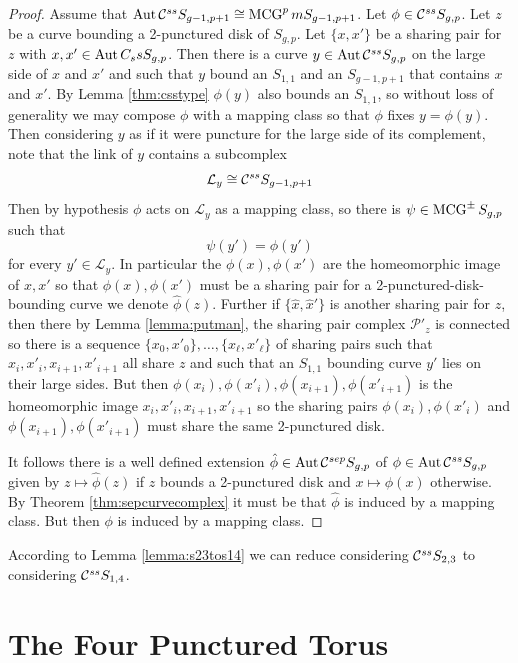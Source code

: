 \begin{proof}
  Assume that $\operatorname{Aut}  \mathcal C^{{ss}}  S_{g-1,p+1} \cong \operatorname{MCG}^pm S_{g-1,p+1}$.
  Let $\phi \in  \mathcal C^{{ss}}  S_{g,p}$.
  Let $z$ be a curve bounding a 2-punctured disk of $S_{g,p}$.
  Let $\{x,x'\}$ be a sharing pair for $z$ with $x,x' \in \operatorname{Aut} C_ss S_{g,p}$.
  Then there is a curve $y \in \operatorname{Aut}  \mathcal C^{{ss}}  S_{g,p}$ on the large side of $x$ and $x'$ and such that $y$ bound an $S_{1,1}$ and an $S_{g-1,p+1}$ that contains $x$ and $x'$.
  By Lemma \ref{thm:csstype} $\phi(y)$ also bounds an $S_{1,1}$,
  so without loss of generality we may compose $\phi$ with a mapping class so that $\phi$ fixes $y=\phi(y)$.
  Then considering $y$ as if it were puncture for the large side of its complement, note that the link of $y$
  contains a subcomplex $$\mathcal L_y \cong  \mathcal C^{{ss}}  S_{g-1,p+1}$$
  Then by hypothesis $\phi$ acts on $\mathcal L_y$ as a mapping class,
  so there is $\psi \in \operatorname{MCG}^\pm S_{g,p}$ such that
  $$\psi(y') = \phi(y')$$
  for every $y' \in \mathcal L_y$.
  In particular the $\phi(x),\phi(x')$ are the homeomorphic image of $x,x'$ so that
  $\phi(x),\phi(x')$ must be a sharing pair for a 2-punctured-disk-bounding curve we denote $\hat \phi(z)$.
  Further if $\{\hat x, \hat x'\}$ is another sharing pair for $z$,
  then there by  Lemma \ref{lemma:putman}, the sharing pair complex $\mathcal P'_z$ is connected so
  there is a sequence $\{x_0,x'_0\}, \ldots, \{x_\ell,x'_\ell\}$
  of sharing pairs such that $x_i,x'_i,x_{i+1},x'_{i+1}$ all share $z$ and such that an  $S_{1,1}$ bounding curve $y'$
  lies on their large sides.
  But then $\phi(x_i),\phi(x'_i),\phi(x_{i+1}),\phi(x'_{i+1})$ is the homeomorphic image $x_i,x'_i,x_{i+1},x'_{i+1}$
  so the sharing pairs $\phi(x_i),\phi(x'_i)$ and $\phi(x_{i+1}),\phi(x'_{i+1})$ must share the same 2-punctured disk.

  It follows there is a well defined extension $\hat \phi \in \operatorname{Aut}  \mathcal C^{{sep}}  S_{g,p}$ of
  $\phi \in \operatorname{Aut}  \mathcal C^{{ss}}  S_{g,p}$ given by $z \mapsto \hat \phi(z)$ if $z$ bounds a 2-punctured disk and
  $x \mapsto \phi(x)$ otherwise.
  By Theorem \ref{thm:sepcurvecomplex} it must be that $\hat \phi$ is induced by a mapping class.
  But then $\phi$ is induced by a mapping class.
\end{proof}


\begin{remark}
  According to Lemma \ref{lemma:s23tos14}
  we can reduce considering $ \mathcal C^{{ss}}  S_{2,3}$ to considering $ \mathcal C^{{ss}}  S_{1,4}$.
\end{remark}


\section{The Four Punctured Torus}


